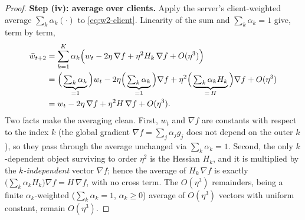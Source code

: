 \documentclass[11pt]{article}
\theoremstyle{definition}
\theoremstyle{remark}
\begin{document}
\begin{proof}
\medskip
\noindent\textbf{Step (iv): average over clients.}
Apply the server's client-weighted average $\sum_k\alpha_k(\cdot)$ to \eqref{eq:w2-client}.
Linearity of the sum and $\sum_k\alpha_k=1$ give, term by term,
\begin{align}
  \bar w_{t+2}
  &= \sum_{k=1}^{K}\alpha_k\Big(w_t-2\eta\,\nabla f+\eta^2 H_k\,\nabla f+O(\eta^3)\Big) \notag\\
  &= \Big(\underbrace{\textstyle\sum_k\alpha_k}_{=1}\Big)w_t
     - 2\eta\Big(\underbrace{\textstyle\sum_k\alpha_k}_{=1}\Big)\nabla f
     + \eta^2\Big(\underbrace{\textstyle\sum_k\alpha_k H_k}_{=\,H}\Big)\nabla f
     + O(\eta^3) \notag\\
  &= w_t - 2\eta\,\nabla f + \eta^2 H\,\nabla f + O(\eta^3).
  \label{eq:avg}
\end{align}
Two facts make the averaging clean. First, $w_t$ and $\nabla f$ are constants with respect to
the index $k$ (the global gradient $\nabla f=\sum_j\alpha_j g_j$ does not depend on the outer
$k$), so they pass through the average unchanged via $\sum_k\alpha_k=1$. Second, the only
$k$-dependent object surviving to order $\eta^2$ is the Hessian $H_k$, and it is multiplied by
the \emph{$k$-independent} vector $\nabla f$; hence the average of $H_k\,\nabla f$ is exactly
$\big(\sum_k\alpha_k H_k\big)\nabla f=H\,\nabla f$, with no cross term. The $O(\eta^3)$
remainders, being a finite $\alpha_k$-weighted ($\sum_k\alpha_k=1$, $\alpha_k\ge0$) average of
$O(\eta^3)$ vectors with uniform constant, remain $O(\eta^3)$.


\end{proof}
\end{document}
